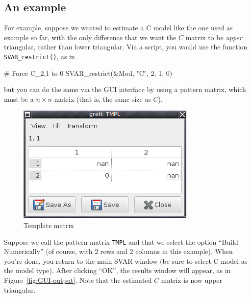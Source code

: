 \documentclass[a4paper,10pt]{article}
\newcounter{script}[section]
\begin{document}
\subsection{An example}

For example, suppose we wanted to estimate a C model like the one used
as example so far, with the only difference that we want the $C$
matrix to be \emph{upper} triangular, rather than lower
triangular. Via a script, you would use the function
\texttt{SVAR\_restrict()}, as in
\begin{code}
# Force C_{2,1} to 0
SVAR_restrict(&Mod, "C", 2, 1, 0)
\end{code}
but you can do the same via the GUI interface by using a pattern
matrix, which must be a $n \times n$ matrix (that is, the same
size as $C$). 

\begin{figure}[htbp]
  \centering
  \includegraphics[scale=0.5]{TMPL.png}
  \caption{Template matrix}
  \label{fig:tmpl}
\end{figure}

Suppose we call the pattern matrix \texttt{TMPL} and that we select
the option ``Build Numerically'' (of course, with 2 rows and 2 columns
in this example).  When you're done, you return to the main SVAR
window (be sure to select C-model as the model type). After clicking
``OK'', the results window will appear, as in
Figure~\ref{fig:GUI-output}. Note that the estimated $C$ matrix is now
upper triangular.
\end{document}
